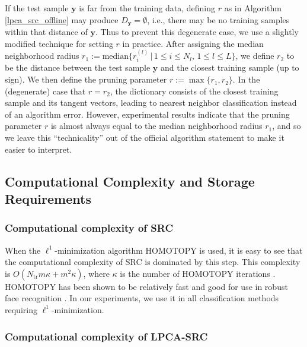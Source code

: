 \documentclass[review]{elsarticle}
\begin{document}
\begin{rem} \label{rem:r}
If the test sample $\bm{y}$ is far from the training data, defining $r$ as in Algorithm \ref{lpca_src_offline} may produce $D_{\bm{y}} = \emptyset$, i.e., there may be no training samples within that distance of $\bm{y}$. Thus to prevent this degenerate case, we use a slightly modified technique for setting $r$ in practice. After assigning the median neighborhood radius $r_1 := \mathrm{median} \big\{ r_i^{(l)}\, | \, 1\leq i \leq N_l, \, 1\leq l \leq L \big\}$, we define $r_2$ to be the distance between the test sample $\bm{y}$ and the closest training sample (up to sign). We then define the pruning parameter $r := \max\{r_1,r_2\}$. In the (degenerate) case that $r=r_2$, the dictionary consists of the closest training sample and its tangent vectors, leading to nearest neighbor classification instead of an algorithm error. However, experimental results indicate that the pruning parameter $r$ is almost always equal to the median neighborhood radius $r_1$, and so we leave this ``technicality'' out of the official algorithm statement to make it easier to interpret.
\end{rem}




\subsection{Computational Complexity and Storage Requirements}\label{sec:cc}



\subsubsection{Computational complexity of SRC}

When the $\ell^1$-minimization algorithm HOMOTOPY \cite{don:hom} is used, it is easy to see that the computational complexity of SRC is dominated by this step. This complexity is $O(N_\mathrm{tr}m\kappa+ m^2\kappa)$, where $\kappa$ is the number of HOMOTOPY iterations \cite{yan:rev}. HOMOTOPY has been shown to be relatively fast and good for use in robust face recognition \cite{yan:rev}. In our experiments, we use it in all classification methods requiring $\ell^1$-minimization. 



\subsubsection{Computational complexity of LPCA-SRC}
\end{document}
